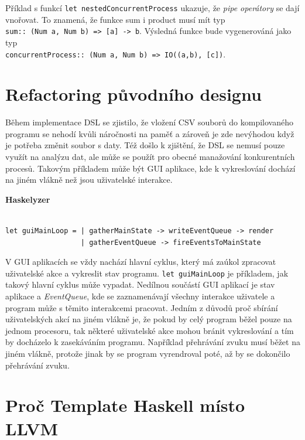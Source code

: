 \documentclass[male,czech]{kithesis}
\newcommand{\haskellInline}[1]{\colorbox{gray!10}{\texttt{#1}}}
\begin{document}
Příklad s funkcí \haskellInline{let nestedConcurrentProcess} ukazuje, 
že \textit{pipe operátory} se dají vnořovat. 
To znamená, 
že funkce sum i product musí mít typ \\
\haskellInline{sum:: (Num a, Num b) => [a] -> b}. 
Výsledná funkce bude vygenerováná jako typ \\
\haskellInline{concurrentProcess:: (Num a, Num b) => IO((a,b), [c])}.

\section{Refactoring původního designu}

Během implementace DSL se zjistilo,
že vložení CSV souborů do kompilovaného programu se nehodí
kvůli náročnosti na paměť a 
zároveň je zde nevýhodou když je potřeba změnit soubor s daty.
Též došlo k zjištění,
že DSL se nemusí pouze využít na analýzu dat,
ale může se použít pro obecné manažování konkurentních procesů.
Takovým příkladem může být GUI aplikace,
kde k vykreslování dochází na jiném vlákně 
než jsou uživatelské interakce.

\textbf{Haskelyzer}
\begin{verbatim}

let guiMainLoop = | gatherMainState -> writeEventQueue -> render
                  | gatherEventQueue -> fireEventsToMainState

\end{verbatim}

V GUI aplikacích se vždy nachází hlavní cyklus,
který má zaúkol zpracovat uživatelské akce a 
vykreslit stav programu.
\haskellInline{let guiMainLoop} je příkladem,
jak takový hlavní cyklus může vypadat.
Nedílnou součástí GUI aplikací je stav aplikace a
\textit{EventQueue}, kde
se zaznamenávají všechny interakce uživatele a 
program může s těmito interakcemi pracovat.
Jedním z důvodů proč sbírání uživatelských akcí na jiném vlákně je,
že pokud by celý program běžel pouze na jednom procesoru,
tak některé uživatelské akce mohou bránit vykreslování a
tím by docházelo k zasekáváním programu.
Například přehrávání zvuku musí běžet na jiném vlákně,
protože jinak by se program vyrendroval poté,
až by se dokončilo přehrávání zvuku.

\section{Proč Template Haskell místo LLVM}
\end{document}
